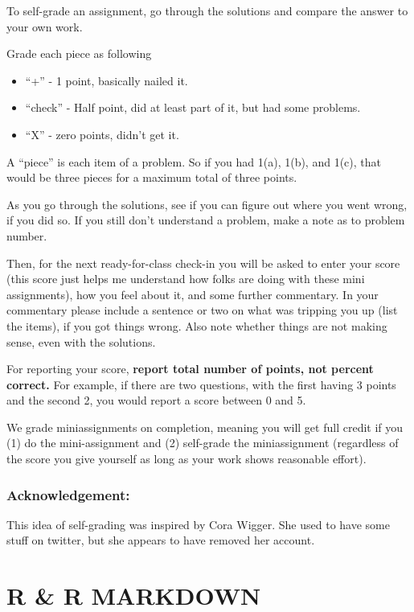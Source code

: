 \documentclass[
  letterpaper,
  DIV=11,
  numbers=noendperiod]{scrreprt}
\providecommand{\tightlist}{%
  \setlength{\itemsep}{0pt}\setlength{\parskip}{0pt}}\usepackage{longtable,booktabs,array}
\begin{document}
To self-grade an assignment, go through the solutions and compare the
answer to your own work.

Grade each piece as following

\begin{itemize}
\tightlist
\item
  ``+'' - 1 point, basically nailed it.
\item
  ``check'' - Half point, did at least part of it, but had some
  problems.
\item
  ``X'' - zero points, didn't get it.
\end{itemize}

A ``piece'' is each item of a problem. So if you had 1(a), 1(b), and
1(c), that would be three pieces for a maximum total of three points.

As you go through the solutions, see if you can figure out where you
went wrong, if you did so. If you still don't understand a problem, make
a note as to problem number.

Then, for the next ready-for-class check-in you will be asked to enter
your score (this score just helps me understand how folks are doing with
these mini assignments), how you feel about it, and some further
commentary. In your commentary please include a sentence or two on what
was tripping you up (list the items), if you got things wrong. Also note
whether things are not making sense, even with the solutions.

For reporting your score, \textbf{report total number of points, not
percent correct.} For example, if there are two questions, with the
first having 3 points and the second 2, you would report a score between
0 and 5.

We grade miniassignments on completion, meaning you will get full credit
if you (1) do the mini-assignment and (2) self-grade the miniassignment
(regardless of the score you give yourself as long as your work shows
reasonable effort).

\section*{Acknowledgement:}\label{acknowledgement}


This idea of self-grading was inspired by Cora Wigger. She used to have
some stuff on twitter, but she appears to have removed her account.

\part{R \& R MARKDOWN}
\end{document}
